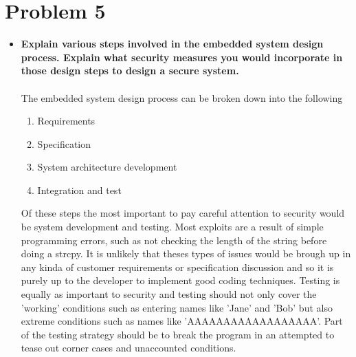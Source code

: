 \documentclass[11pt]{article}
\begin{document}
\section*{Problem 5}
\begin{itemize}
    \item \textbf{
            Explain various steps involved in the embedded system design process.
            Explain what security  measures you would incorporate in those 
            design steps to design a secure system.
        }\\\\
        The embedded system design process can be broken down into the following
        \begin{enumerate}
            \item Requirements
            \item Specification
            \item System architecture development
            \item Integration and test
        \end{enumerate}
        Of these steps the most important to pay careful attention to security
        would be system development and testing. Most exploits are a result of
        simple programming errors, such as not checking the length of the string
        before doing a strcpy. It is unlikely that theses types of issues would
        be brough up in any kinda of customer requirements or specification 
        discussion and so it is purely up to the developer to implement good
        coding techniques. Testing is equally as important to security and 
        testing should not only cover the 'working' conditions such as 
        entering names like 'Jane' and 'Bob' but also extreme conditions 
        such as names like 'AAAAAAAAAAAAAAAAAA'. Part of the testing strategy 
        should be to break the program in an attempted to tease out corner 
        cases and unaccounted conditions.
\end{itemize}
\end{document}
